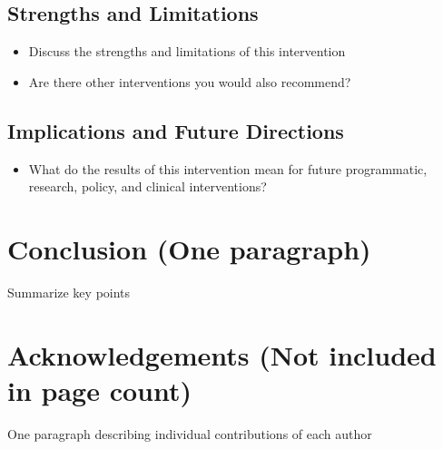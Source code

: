 \documentclass[12pt, letterpaper, draft]{article}
\begin{document}
\subsection{Strengths and Limitations}
\begin{itemize}
    \item Discuss the strengths and limitations of this intervention
    \item Are there other interventions you would also recommend?
\end{itemize}
\subsection{Implications and Future Directions}
\begin{itemize}
    \item What do the results of this intervention mean for future programmatic,
    research, policy, and clinical interventions?
\end{itemize}

\section{Conclusion (One paragraph)}
Summarize key points
\pagebreak

\section{Acknowledgements (Not included in page count)}
One paragraph describing individual contributions of each author
\pagebreak
\pagestyle{empty}



\end{document}
